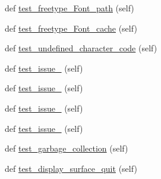 \begin{DoxyCompactItemize}
\item 
def \hyperlink{namespacepygame_1_1tests_1_1freetype__test_abb9af45a81592c8e8c53f7863bb50d33}{test\+\_\+freetype\+\_\+\+Font\+\_\+path} (self)
\item 
def \hyperlink{namespacepygame_1_1tests_1_1freetype__test_af01689a7d8da9ca7db5a5dc06e101009}{test\+\_\+freetype\+\_\+\+Font\+\_\+cache} (self)
\item 
def \hyperlink{namespacepygame_1_1tests_1_1freetype__test_a97eb705cc0bda75955dfa6b594ab5e10}{test\+\_\+undefined\+\_\+character\+\_\+code} (self)
\item 
def \hyperlink{namespacepygame_1_1tests_1_1freetype__test_a1dd595f2ee6cf25894478145afa4c876}{test\+\_\+issue\+\_} (self)
\item 
def \hyperlink{namespacepygame_1_1tests_1_1freetype__test_a5b408f73b37a0b1b6a71480aefa0ae2a}{test\+\_\+issue\+\_} (self)
\item 
def \hyperlink{namespacepygame_1_1tests_1_1freetype__test_a8721cf7d8da822a3e38dc98249471cdc}{test\+\_\+issue\+\_} (self)
\item 
def \hyperlink{namespacepygame_1_1tests_1_1freetype__test_a8ad904a17f70a1e1f5e83b990f05a974}{test\+\_\+issue\+\_} (self)
\item 
def \hyperlink{namespacepygame_1_1tests_1_1freetype__test_a6e1e88c7269e159a9c000bcb8fec0ba5}{test\+\_\+garbage\+\_\+collection} (self)
\item 
def \hyperlink{namespacepygame_1_1tests_1_1freetype__test_a30ef75f0bd27857d022b626b2a5d82ab}{test\+\_\+display\+\_\+surface\+\_\+quit} (self)
\end{DoxyCompactItemize}
